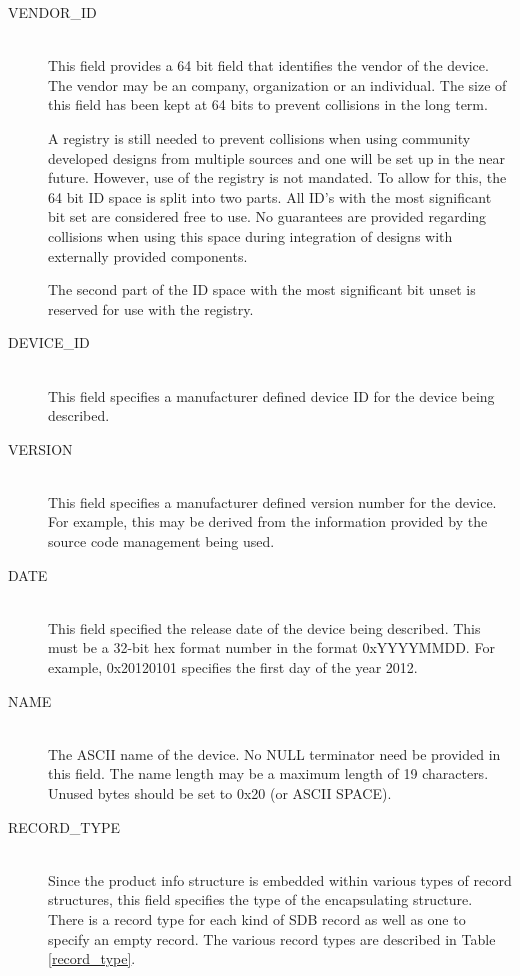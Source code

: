 \documentclass[a4paper, 12pt]{article}
\begin{document}
\begin{description}
\item[VENDOR\_ID] \hfill \\
This field provides a 64 bit field that identifies the vendor of the device. The vendor may
be an company, organization or an individual. The size of this field has been kept at 64
bits to prevent collisions in the long term.

A registry is still needed to prevent collisions when using community developed designs from
multiple sources and one will be set up in the near future. However, use of the registry is
not mandated. To allow for this, the 64 bit ID space is split into two parts. All ID's with
the most significant bit set are considered free to use. No guarantees are provided regarding
collisions when using this space during integration of designs with externally provided
components.

The second part of the ID space with the most significant bit unset is reserved for use with
the registry.

\item[DEVICE\_ID] \hfill \\
This field specifies a manufacturer defined device ID for the device being described.

\item[VERSION] \hfill \\
This field specifies a manufacturer defined version number for the device. For example, this
may be derived from the information provided by the source code management being used.

\item[DATE] \hfill \\
This field specified the release date of the device being described. This must be a 32-bit hex
format number in the format 0xYYYYMMDD. For example, 0x20120101 specifies the first day of the
year 2012.

\item[NAME] \hfill \\
The ASCII name of the device. No NULL terminator need be provided in this field. The name length
may be a maximum length of 19 characters. Unused bytes should be set to 0x20 (or ASCII SPACE).

\item[RECORD\_TYPE] \hfill \\
Since the product info structure is embedded within various types of record structures, this
field specifies the type of the encapsulating structure. There is a record type for each kind
of SDB record as well as one to specify an empty record. The various record types are described
in Table \ref{record_type}.


\end{description}
\end{document}
